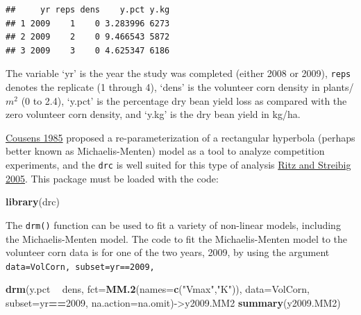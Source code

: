 \documentclass[letterpaper,]{book}
\newenvironment{Shaded}{\begin{snugshade}}{\end{snugshade}}
\newcommand{\DataTypeTok}[1]{\textcolor[rgb]{0.13,0.29,0.53}{#1}}
\newcommand{\DecValTok}[1]{\textcolor[rgb]{0.00,0.00,0.81}{#1}}
\newcommand{\KeywordTok}[1]{\textcolor[rgb]{0.13,0.29,0.53}{\textbf{#1}}}
\newcommand{\NormalTok}[1]{#1}
\newcommand{\OperatorTok}[1]{\textcolor[rgb]{0.81,0.36,0.00}{\textbf{#1}}}
\newcommand{\StringTok}[1]{\textcolor[rgb]{0.31,0.60,0.02}{#1}}
\begin{document}
\begin{Shaded}
\end{Shaded}

\begin{verbatim}
##     yr reps dens    y.pct y.kg
## 1 2009    1    0 3.283996 6273
## 2 2009    2    0 9.466543 5872
## 3 2009    3    0 4.625347 6186
\end{verbatim}

The variable `yr' is the year the study was completed (either 2008 or 2009), \texttt{reps} denotes the replicate (1 through 4), `dens' is the volunteer corn density in plants/\(m^2\) (0 to 2.4), `y.pct' is the percentage dry bean yield loss as compared with the zero volunteer corn density, and `y.kg' is the dry bean yield in kg/ha.

\href{http://onlinelibrary.wiley.com/doi/10.1111/j.1744-7348.1985.tb01567.x/pdf}{Cousens 1985} proposed a re-parameterization of a rectangular hyperbola (perhaps better known as Michaelis-Menten) model as a tool to analyze competition experiments, and the \texttt{drc} is well suited for this type of analysis \href{http://www.jstatsoft.org/v12/i05/paper}{Ritz and Streibig 2005}. This package must be loaded with the code:

\begin{Shaded}
\begin{Highlighting}[]
\KeywordTok{library}\NormalTok{(drc)}
\end{Highlighting}
\end{Shaded}

The \texttt{drm()} function can be used to fit a variety of non-linear models, including the Michaelis-Menten model. The code to fit the Michaelis-Menten model to the volunteer corn data is for one of the two years, 2009, by using the argument \texttt{data=VolCorn,\ subset=yr==2009,}

\begin{Shaded}
\begin{Highlighting}[]
\KeywordTok{drm}\NormalTok{(y.pct }\OperatorTok{~}\StringTok{ }\NormalTok{dens, }\DataTypeTok{fct=}\KeywordTok{MM.2}\NormalTok{(}\DataTypeTok{names=}\KeywordTok{c}\NormalTok{(}\StringTok{"Vmax"}\NormalTok{,}\StringTok{"K"}\NormalTok{)), }\DataTypeTok{data=}\NormalTok{VolCorn, }
    \DataTypeTok{subset=}\NormalTok{yr}\OperatorTok{==}\DecValTok{2009}\NormalTok{, }\DataTypeTok{na.action=}\NormalTok{na.omit)->y2009.MM2}
\KeywordTok{summary}\NormalTok{(y2009.MM2)}
\end{Highlighting}
\end{Shaded}
\end{document}
